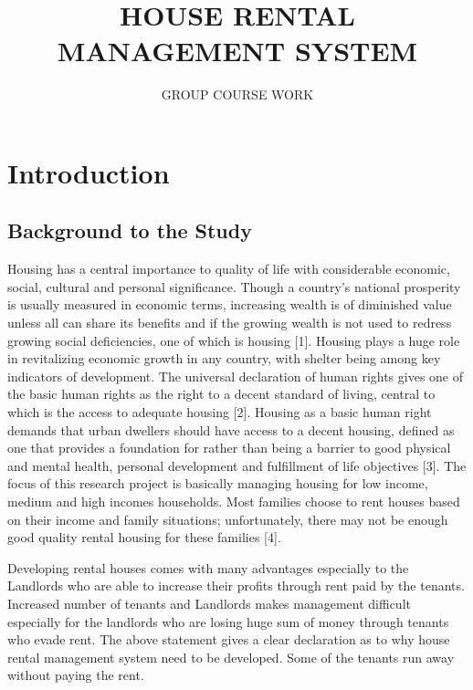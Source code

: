 \documentclass[]{report}
\title{HOUSE RENTAL MANAGEMENT SYSTEM}
\author{GROUP COURSE WORK}
\begin{document}
	\maketitle


\tableofcontents 
\chapter{Introduction} 
\section{Background to the Study}
Housing has a central importance to quality of life with considerable economic, social, cultural and personal significance. Though a country’s national prosperity is usually measured in economic terms, increasing wealth is of diminished value unless all can share its benefits and if the growing wealth is not used to redress growing social deficiencies, one of which is housing [1]. Housing plays a huge role in revitalizing economic growth in any country, with shelter being among key indicators of development. 
The universal declaration of human rights gives one of the basic human rights as the right to a decent standard of living, central to which is the access to adequate housing [2]. Housing as a basic human right demands that urban dwellers should have access to a decent housing, defined as one that provides a foundation for rather than being a barrier to good physical and mental health, personal development and fulfillment of life objectives [3]. The focus of this research project is basically managing housing for low income, medium and high incomes households. Most families choose to rent houses based on their income and family situations; unfortunately, there may not be enough good quality rental housing for these families [4]. 

Developing rental houses comes with many advantages especially to the Landlords who are able to increase their profits through rent paid by the tenants. Increased number of tenants and Landlords makes management difficult especially for the landlords who are losing huge sum of money through tenants who evade rent. 
The above statement gives a clear declaration as to why house rental management system need to be developed. Some of the tenants run away without paying the rent.
\end{document}
